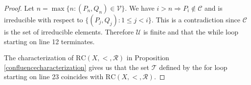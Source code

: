 \begin{ap}
\begin{proof}
    Let $n = \max\{n : (P_n,Q_n) \in \mathcal{V}\}.$ We have $i > n \Rightarrow
    P_i \notin \mathcal{C}$ and is irreducible with respect to $\{(P_j,Q_j) : 1
    \le j < i\}.$ This is a contradiction since $\mathcal{C}$ is the set of
    irreducible elements. Therefore $\mathcal{U}$ is finite and that the while
    loop starting on line 12 terminates.

    The characterization of $\mathrm{RC}(X,<,\mathcal{R})$ in Proposition
    \ref{confluencecharacterization} gives us that the set $\mathcal{T}$
    defined by the for loop starting on line 23 coincides with
    $\mathrm{RC}(X,<,\mathcal{R})$.
\end{proof}
\end{ap}

